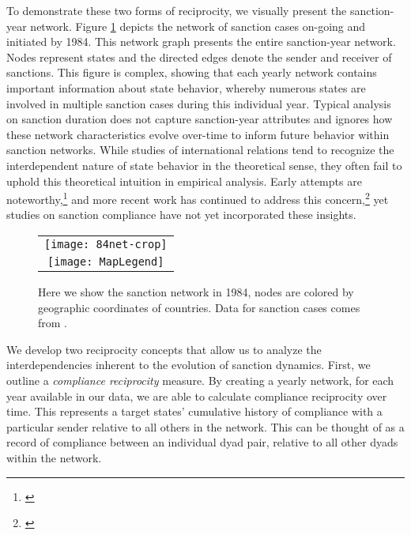 To demonstrate these two forms of reciprocity, we visually present the sanction-year network. Figure \ref{fig:spaghetti} depicts the network of sanction cases on-going and initiated by 1984. This network graph presents the entire sanction-year network.  Nodes represent states and the directed edges denote the sender and receiver of sanctions. This figure is complex, showing that each yearly network contains important information about state behavior, whereby numerous states are involved in multiple sanction cases during this individual year. Typical analysis on sanction duration does not capture sanction-year attributes and ignores how these network characteristics evolve over-time to inform future behavior within sanction networks. While studies of international relations tend to recognize the interdependent nature of state behavior in the theoretical sense, they often fail to uphold this theoretical intuition in empirical analysis. Early attempts are noteworthy,\footnote{\cite{keohane1989reciprocity,goldstein1991reciprocity}} and more recent work has continued to address this concern,\footnote{\cite{mitchell2001,cranmer2014reciprocity}} yet studies on sanction compliance have not yet incorporated these insights. 

\begin{figure}[ht]
  \centering
  \begin{tabular}{c}
	  \texttt{[image: 84net-crop]} \\
	  \texttt{[image: MapLegend]}
  \end{tabular}
  \caption{Here we show the sanction network in 1984, nodes are colored by geographic coordinates of countries. Data for sanction cases comes from \citet{morgan2009threat}.}
  \label{fig:spaghetti}
\end{figure}
\FloatBarrier

We develop two reciprocity concepts that allow us to analyze the interdependencies inherent to the evolution of sanction dynamics. First, we outline a \textit{compliance reciprocity} measure. By creating a yearly network, for each year available in our data, we are able to calculate compliance reciprocity over time. This represents a target states' cumulative history of compliance with a particular sender relative to all others in the network. This can be thought of as a record of compliance between an individual dyad pair, relative to all other dyads within the network. 

